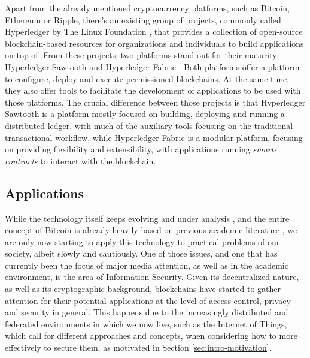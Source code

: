 Apart from the already mentioned cryptocurrency platforms, such as Bitcoin, Ethereum or Ripple, there's an existing group of projects, commonly called Hyperledger \cite{hyperledger} by The Linux Foundation \cite{linuxfoundation}, that provides a collection of open-source blockchain-based resources for organizations and individuals to build applications on top of. From these projects, two platforms stand out for their maturity: Hyperledger Sawtooth \cite{hyperledger_sawtooth} and Hyperledger Fabric \cite{hyperledger_fabric}. Both platforms offer a platform to configure, deploy and execute permissioned blockchains. At the same time, they also offer tools to facilitate the development of applications to be used with those platforms. The crucial difference between those projects is that Hyperledger Sawtooth is a platform mostly focused on building, deploying and running a distributed ledger, with much of the auxiliary tools focusing on the traditional transactional workflow, while Hyperledger Fabric is a modular platform, focusing on providing flexibility and extensibility, with applications running \emph{smart-contracts} to interact with the blockchain.

\subsection{Applications}

While the technology itself keeps evolving and under analysis \cite{eyal_bitcoin-ng:_2016, wang_research_2018, gervais_security_2016, lin_survey_2017}, and the entire concept of Bitcoin is already heavily based on previous academic literature \cite{narayanan_bitcoins_2017}, we are only now starting to apply this technology to practical problems of our society, albeit slowly and cautiously. One of those issues, and one that has currently been the focus of major media attention, as well as in the academic environment, is the area of Information Security. Given its decentralized nature, as well as its cryptographic background, blockchains have started to gather attention for their potential applications at the level of access control, privacy and security in general. This happens due to the increasingly distributed and federated environments in which we now live, such as the Internet of Things, which call for different approaches and concepts, when considering how to more effectively to secure them, as motivated in Section \ref{sec:intro-motivation}.

